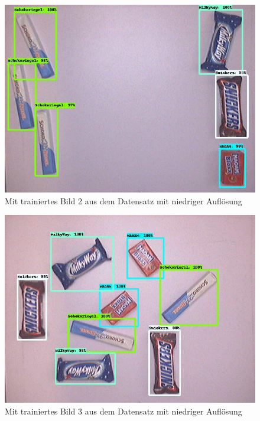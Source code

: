     \begin{figure}[H]
        \centering
        \includegraphics[angle = 90, width = \textwidth]{Bilder/models/model_comparison/ssd_resnet50_v1_fpn_640x640_coco17_tpu-8/trained_2.jpg}
        \caption{Mit trainiertes Bild 2 aus dem Datensatz mit niedriger Auflösung}
    \end{figure}
    
    \begin{figure}[H]
        \centering
        \includegraphics[angle = 90, width = \textwidth]{Bilder/models/model_comparison/ssd_resnet50_v1_fpn_640x640_coco17_tpu-8/trained_3.jpg}
        \caption{Mit trainiertes Bild 3 aus dem Datensatz mit niedriger Auflösung}
    \end{figure}
    
